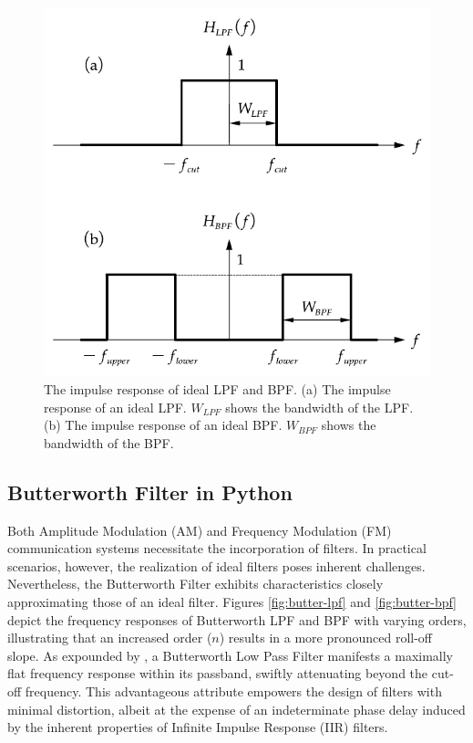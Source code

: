 \documentclass[../ECE459FinalProjectReport.tex]{subfiles}
\begin{document}
\begin{figure}[b]
    \centering
    \includegraphics[scale=0.4]{plots/ideal-filters.pdf}
    \caption{The impulse response of ideal LPF and BPF. (a) The impulse response of an ideal LPF. $W_{LPF}$ shows the bandwidth of the LPF. (b) The impulse response of an ideal BPF. $W_{BPF}$ shows the bandwidth of the BPF.}
    \label{fig:ideal-filter}
\end{figure}

\subsection{Butterworth Filter in Python}

Both Amplitude Modulation (AM) and Frequency Modulation (FM) communication systems necessitate the incorporation of filters. In practical scenarios, however, the realization of ideal filters poses inherent challenges. Nevertheless, the Butterworth Filter exhibits characteristics closely approximating those of an ideal filter. Figures \ref{fig:butter-lpf} and \ref{fig:butter-bpf} depict the frequency responses of Butterworth LPF and BPF with varying orders, illustrating that an increased order ($n$) results in a more pronounced roll-off slope. As expounded by \cite{storrButterworthFilterDesign2013, kudekiAnalogSignalsSystems2009}, a Butterworth Low Pass Filter manifests a maximally flat frequency response within its passband, swiftly attenuating beyond the cut-off frequency. This advantageous attribute empowers the design of filters with minimal distortion, albeit at the expense of an indeterminate phase delay induced by the inherent properties of Infinite Impulse Response (IIR) filters.
\end{document}
